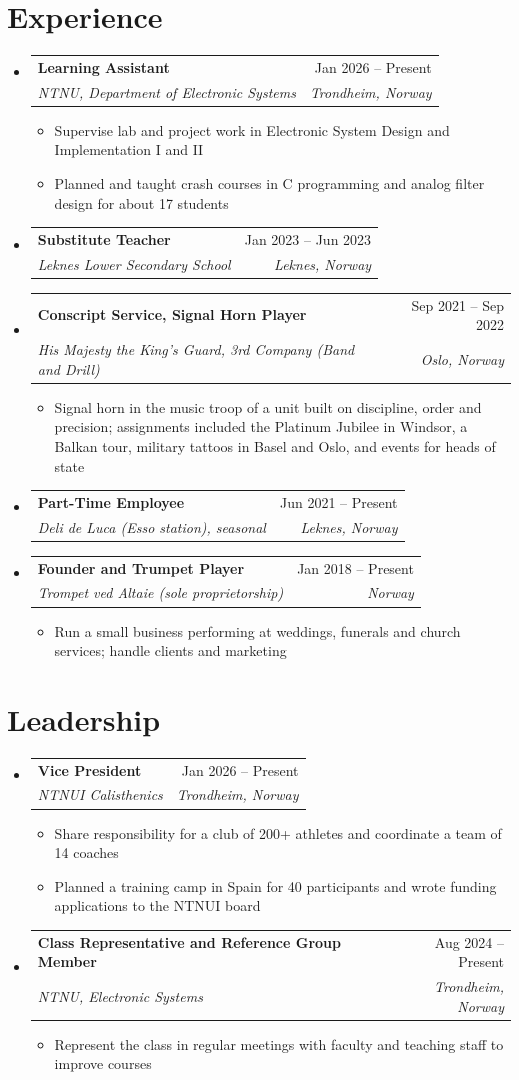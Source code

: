 \documentclass[a4paper,10pt]{article}
\makeatletter
\newcommand{\resumeItem}[1]{
  \item\small{#1}
}
\newcommand{\resumeSubheading}[4]{
  \vspace{-2pt}\item
    \begin{tabular*}{\linewidth}[t]{l@{\extracolsep{\fill}}r}
      \textbf{#1} & #2 \\
      \textit{\small#3} & \textit{\small #4} \\
    \end{tabular*}\vspace{-7pt}
}
\newcommand{\resumeSubHeadingListStart}{\begin{itemize}[leftmargin=0.15in, label={}, itemsep=2pt, topsep=1pt]}
\newcommand{\resumeSubHeadingListEnd}{\end{itemize}}
\newcommand{\resumeItemListStart}{\begin{itemize}[leftmargin=0.2in, itemsep=0pt, parsep=0pt, topsep=3pt]}
\newcommand{\resumeItemListEnd}{\end{itemize}\vspace{-2pt}}
\makeatother
\begin{document}
\section{Experience}
  \resumeSubHeadingListStart

    \resumeSubheading
      {Learning Assistant}{Jan 2026 -- Present}
      {NTNU, Department of Electronic Systems}{Trondheim, Norway}
      \resumeItemListStart
        \resumeItem{Supervise lab and project work in Electronic System Design and Implementation I and II}
        \resumeItem{Planned and taught crash courses in C programming and analog filter design for about 17 students}
      \resumeItemListEnd

    \resumeSubheading
      {Substitute Teacher}{Jan 2023 -- Jun 2023}
      {Leknes Lower Secondary School}{Leknes, Norway}

    \resumeSubheading
      {Conscript Service, Signal Horn Player}{Sep 2021 -- Sep 2022}
      {His Majesty the King's Guard, 3rd Company (Band and Drill)}{Oslo, Norway}
      \resumeItemListStart
        \resumeItem{Signal horn in the music troop of a unit built on discipline, order and precision; assignments included the Platinum Jubilee in Windsor, a Balkan tour, military tattoos in Basel and Oslo, and events for heads of state}
      \resumeItemListEnd

    \resumeSubheading
      {Part-Time Employee}{Jun 2021 -- Present}
      {Deli de Luca (Esso station), seasonal}{Leknes, Norway}

    \resumeSubheading
      {Founder and Trumpet Player}{Jan 2018 -- Present}
      {Trompet ved Altaie (sole proprietorship)}{Norway}
      \resumeItemListStart
        \resumeItem{Run a small business performing at weddings, funerals and church services; handle clients and marketing}
      \resumeItemListEnd

  \resumeSubHeadingListEnd

\section{Leadership}
  \resumeSubHeadingListStart

    \resumeSubheading
      {Vice President}{Jan 2026 -- Present}
      {NTNUI Calisthenics}{Trondheim, Norway}
      \resumeItemListStart
        \resumeItem{Share responsibility for a club of 200+ athletes and coordinate a team of 14 coaches}
        \resumeItem{Planned a training camp in Spain for 40 participants and wrote funding applications to the NTNUI board}
      \resumeItemListEnd

    \resumeSubheading
      {Class Representative and Reference Group Member}{Aug 2024 -- Present}
      {NTNU, Electronic Systems}{Trondheim, Norway}
      \resumeItemListStart
        \resumeItem{Represent the class in regular meetings with faculty and teaching staff to improve courses}
      \resumeItemListEnd

  \resumeSubHeadingListEnd
\end{document}
